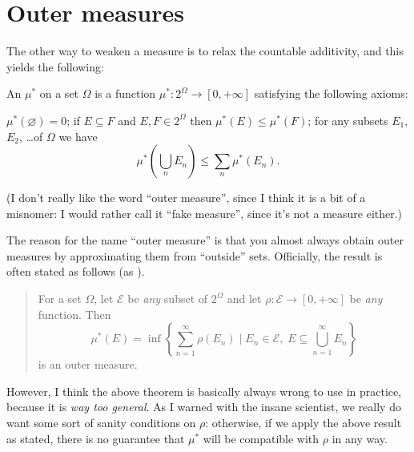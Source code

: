 \section{Outer measures}
The other way to weaken a measure is to relax the countable additivity,
and this yields the following:
\begin{definition}
	An  $\mu^\ast$ on a set $\Omega$
	is a function $\mu^\ast \colon 2^\Omega \to [0, +\infty]$
	satisfying the following axioms:
	\begin{itemize}
		\ii $\mu^\ast(\varnothing) = 0$;
		\ii if $E \subseteq F$ and $E,F \in 2^{\Omega}$
		then $\mu^\ast(E) \le \mu^\ast(F)$;
		\ii for any subsets $E_1$, $E_2$, \dots of $\Omega$ we have
		\[ \mu^\ast \left( \bigcup_n E_n \right)
			\le \sum_n \mu^\ast(E_n). \]
	\end{itemize}
	(I don't really like the word ``outer measure'',
	since I think it is a bit of a misnomer:
	I would rather call it ``fake measure'',
	since it's not a measure either.)
\end{definition}

The reason for the name ``outer measure''
is that you almost always obtain outer measures
by approximating them from ``outside'' sets.
Officially, the result is often stated as follows
(as ).
\begin{quote}
	For a set $\Omega$, let $\mathcal{E}$ be \emph{any} subset of $2^{\Omega}$
	and let $\rho \colon \mathcal{E} \to [0,+\infty]$ be \emph{any} function.
	Then
	\[ \mu^\ast(E) = \inf \left\{ \sum_{n=1}^\infty \rho(E_n) \mid
		E_n \in \mathcal{E}, \;
		E \subseteq \bigcup_{n=1}^\infty E_n \right\} \]
	is an outer measure.
\end{quote}

However, I think the above theorem is basically always
wrong to use in practice, because it is \emph{way too general}.
As I warned with the insane scientist,
we really do want some sort of sanity conditions on $\rho$:
otherwise, if we apply the above result as stated,
there is no guarantee that $\mu^\ast$ will
be compatible with $\rho$ in any way.


